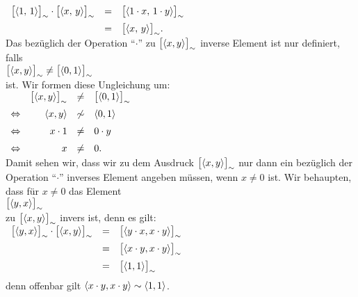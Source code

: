 $
\begin{array}[t]{lcl}
      \bigl[\pair(1,\,1)\bigr]_\sim \cdot  \bigl[\pair(x,\,y)\bigr]_\sim
& = & \bigl[\pair(1 \cdot x,\,1 \cdot y)\bigr]_\sim                      \\[0.2cm]
& = & \bigl[\pair(x,\,y)\bigr]_\sim.
\end{array}
$
\\[0.2cm]
Das bez\"{u}glich der Operation ``$\cdot$'' zu $\bigl[\pair(x,y)\bigr]_\sim$ inverse Element ist nur definiert,
falls
\\[0.2cm]
\hspace*{1.3cm}
 $\bigl[\pair(x,y)\bigr]_\sim \not= \bigl[\pair(0,1)\bigr]_\sim$ 
\\[0.2cm]
ist.  Wir formen diese Ungleichung um:
\\[0.2cm]
\hspace*{1.3cm}
$
\begin{array}[t]{lrcl}
                & \bigl[\pair(x,y)\bigr]_\sim & \not= & \bigl[\pair(0,1)\bigr]_\sim  \\[0.2cm]
\Leftrightarrow & \pair(x,y) & \not\sim & \pair(0,1)                                 \\[0.2cm]
\Leftrightarrow & x \cdot 1  & \not=    & 0 \cdot y                                  \\[0.2cm]
\Leftrightarrow & x          & \not=    & 0. 
\end{array}
$
\\[0.2cm]
Damit sehen wir, dass wir zu dem Ausdruck $\bigl[\pair(x,y)\bigr]_\sim$ nur dann ein bez\"{u}glich der Operation
``$\cdot$'' inverses Element angeben m\"{u}ssen, wenn $x \not= 0$ ist.  Wir behaupten, dass f\"{u}r $x \not= 0$
das Element
\\[0.2cm]
\hspace*{1.3cm}
$\bigl[\pair(y,x)\bigr]_\sim$
\\[0.2cm]
zu $\bigl[\pair(x,y)\bigr]_\sim$ invers ist, denn es gilt:
\\[0.2cm]
\hspace*{1.3cm}
$
\begin{array}[t]{lcl}
      \bigl[\pair(y,x)\bigr]_\sim \cdot \bigl[\pair(x,y)\bigr]_\sim 
& = & \bigl[\pair(y \cdot x,x \cdot y)\bigr]_\sim                   \\[0.2cm]
& = & \bigl[\pair(x \cdot y,x \cdot y)\bigr]_\sim                   \\[0.2cm]
& = & \bigl[\pair(1, 1)\bigr]_\sim                   \\[0.2cm]
\end{array}
$
\\[0.2cm]
denn offenbar gilt $\pair(x \cdot y,x \cdot y) \sim \pair(1,1)$.
\vspace*{0.2cm}

